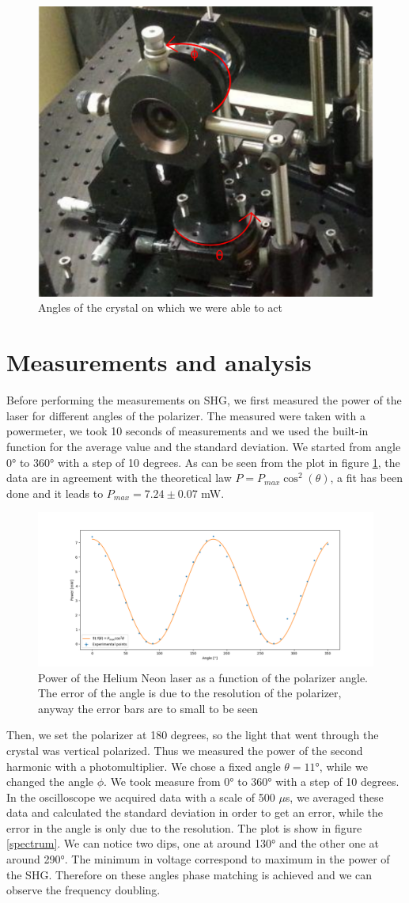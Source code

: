 \documentclass[a4paper,10pt]{article}
\begin{document}
\begin{figure}[H]
\centering
\includegraphics[width = .4\textwidth]{polarizerangle}
\caption{Angles of the crystal on which  we were able to act}
\end{figure} 
\section{Measurements and analysis}
Before performing the measurements on SHG, we first measured the power of the laser for different angles of the polarizer. The measured were taken with a powermeter, we took 10 seconds of measurements and we used the built-in function for the average value and the standard deviation. We started from angle 0° to 360° with a step of 10 degrees. As can be seen from the plot in figure \ref{polarizer}, the data are in agreement with the theoretical law $P = P_{max}\cos^2(\theta)$, a fit has been done and it leads to $P_{max} = 7.24\pm  0.07$ mW.
\begin{figure}[H]
\centering
\includegraphics[width = \textwidth]{polarization}
\caption{Power of the Helium Neon laser as a function of the polarizer angle. The error of the angle is due to the resolution of the polarizer, anyway the error bars are to small to be seen}
\label{polarizer}
\end{figure}
Then, we set the polarizer at 180 degrees, so the light that went through the crystal was vertical polarized. Thus we measured the power of the second harmonic with a photomultiplier. We chose a fixed angle $\theta = 11$°, while we changed the angle $\phi$. We took measure from 0° to 360° with a step of 10 degrees. In the oscilloscope we acquired data with a scale of 500 $\mu$s, we averaged these data and calculated the standard deviation in order to get an error, while the error in the angle is only due to the resolution. The plot is show in figure \ref{spectrum}. We can notice two dips, one at around 130° and the other one at around 290°. The minimum in voltage correspond to maximum in the power of the SHG. Therefore on these angles phase matching is achieved and we can observe the frequency doubling.
\end{document}
